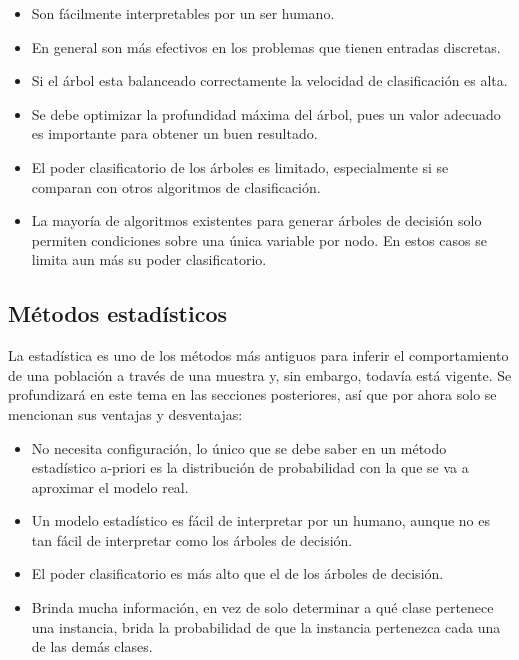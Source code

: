 \documentclass[a4paper, 11pt, oneside]{report}
\begin{document}
	\begin{itemize}
	
	\item Son fácilmente interpretables por un ser humano.

	\item En general son más efectivos en los problemas que tienen entradas discretas.
	
	\item Si el árbol esta balanceado correctamente la velocidad de clasificación es alta.
	
	\item Se debe optimizar la profundidad máxima del árbol, pues un valor adecuado es importante para obtener un buen resultado.
	
	\item El poder clasificatorio de los árboles es limitado, especialmente si se comparan con otros algoritmos de clasificación.
	
	\item La mayoría de algoritmos existentes para generar árboles de decisión solo permiten condiciones sobre una única variable por nodo. En estos casos se limita aun más su poder clasificatorio. 

	\end{itemize}

\subsection{Métodos estadísticos}

La estadística es uno de los métodos más antiguos para inferir el comportamiento de una población a través de una muestra y, sin embargo, todavía está vigente. Se profundizará en este tema en las secciones posteriores, así que por ahora solo se mencionan sus ventajas y desventajas:

	\begin{itemize}

	\item No necesita configuración, lo único que se debe saber en un método estadístico a-priori es la distribución de probabilidad con la que se va a aproximar el modelo real.

	\item Un modelo estadístico es fácil de interpretar por un humano, aunque no es tan fácil de interpretar como los árboles de decisión.

	\item El poder clasificatorio es más alto que el de los árboles de decisión.

	\item Brinda mucha información, en vez de solo determinar a qué clase pertenece una instancia, brida la probabilidad de que la instancia pertenezca cada una de las demás clases.
	
	\end{itemize}
	
\end{document}
